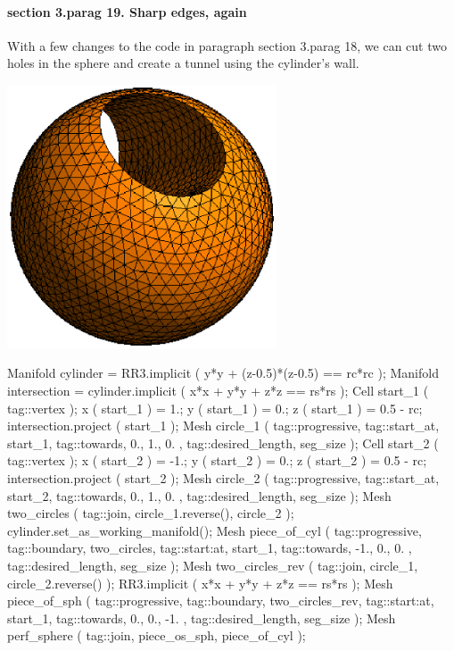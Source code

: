 \paragraph{\numb section 3.\numb parag 19. Sharp edges, again}

With a few changes to the code in paragraph \numb section 3.\numb parag 18,
we can cut two holes in the sphere and create a tunnel using the cylinder's wall.
\medskip

\centerline{\includegraphics[width=80mm]{sphere-tunnel.eps}}

\verbatim
   Manifold cylinder = RR3.implicit ( y*y + (z-0.5)*(z-0.5) == rc*rc );
   Manifold intersection = cylinder.implicit ( x*x + y*y + z*z == rs*rs );
   Cell start_1 ( tag::vertex );
   x ( start_1 ) = 1.;  y ( start_1 ) = 0.;  z ( start_1 ) = 0.5 - rc;
   intersection.project ( start_1 );
   Mesh circle_1 ( tag::progressive, tag::start_at, start_1,
                   tag::towards, { 0., 1., 0. }, tag::desired_length, seg_size );
   Cell start_2 ( tag::vertex );
   x ( start_2 ) = -1.;  y ( start_2 ) = 0.;  z ( start_2 ) = 0.5 - rc;
   intersection.project ( start_2 );
   Mesh circle_2 ( tag::progressive, tag::start_at, start_2,
                   tag::towards, { 0., 1., 0. }, tag::desired_length, seg_size );
   Mesh two_circles ( tag::join, circle_1.reverse(), circle_2 );
   cylinder.set_as_working_manifold();
   Mesh piece_of_cyl ( tag::progressive, tag::boundary, two_circles,
                       tag::start:at, start_1, tag::towards, { -1., 0., 0. },
                       tag::desired_length, seg_size                          );
   Mesh two_circles_rev ( tag::join, circle_1, circle_2.reverse() );
   RR3.implicit ( x*x + y*y + z*z == rs*rs );
   Mesh piece_of_sph ( tag::progressive, tag::boundary, two_circles_rev,
                       tag::start:at, start_1, tag::towards, { 0., 0., -1. },
                       tag::desired_length, seg_size                          );
   Mesh perf_sphere ( tag::join, piece_os_sph, piece_of_cyl );
\endverbatim

